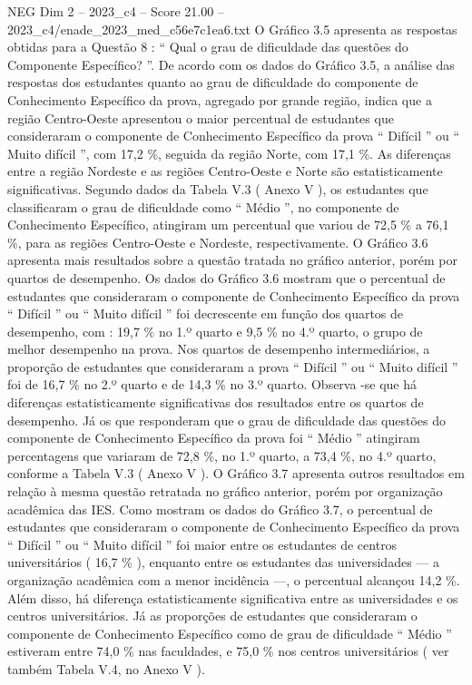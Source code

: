 \begin{textsample}{NEG Dim 2 – 2023\_c4 – Score 21.00 – 2023\_c4/enade\_2023\_med\_c56e7c1ea6.txt}
O Gráfico 3.5 apresenta as respostas obtidas para a Questão 8 : “ Qual o grau de dificuldade das questões do Componente Específico? ”.
De acordo com os dados do Gráfico 3.5, a análise das respostas dos estudantes quanto ao grau de dificuldade do componente de Conhecimento Específico da prova, agregado por grande região, indica que a região Centro-Oeste apresentou o maior percentual de estudantes que consideraram o componente de Conhecimento Específico da prova “ Difícil ” ou “ Muito difícil ”, com 17,2 \%, seguida da região Norte, com 17,1 \%.
As diferenças entre a região Nordeste e as regiões Centro-Oeste e Norte são estatisticamente significativas.
Segundo dados da Tabela V.3 ( Anexo V ), os estudantes que classificaram o grau de dificuldade como “ Médio ”, no componente de Conhecimento Específico, atingiram um percentual que variou de 72,5 \% a 76,1 \%, para as regiões Centro-Oeste e Nordeste, respectivamente.
O Gráfico 3.6 apresenta mais resultados sobre a questão tratada no gráfico anterior, porém por quartos de desempenho.
Os dados do Gráfico 3.6 mostram que o percentual de estudantes que consideraram o componente de Conhecimento Específico da prova “ Difícil ” ou “ Muito difícil ” foi decrescente em função dos quartos de desempenho, com : 19,7 \% no 1.º quarto e 9,5 \% no 4.º quarto, o grupo de melhor desempenho na prova.
Nos quartos de desempenho intermediários, a proporção de estudantes que consideraram a prova “ Difícil ” ou “ Muito difícil ” foi de 16,7 \% no 2.º quarto e de 14,3 \% no 3.º quarto.
Observa -se que há diferenças estatisticamente significativas dos resultados entre os quartos de desempenho.
Já os que responderam que o grau de dificuldade das questões do componente de Conhecimento Específico da prova foi “ Médio ” atingiram percentagens que variaram de 72,8 \%, no 1.º quarto, a 73,4 \%, no 4.º quarto, conforme a Tabela V.3 ( Anexo V ).
O Gráfico 3.7 apresenta outros resultados em relação à mesma questão retratada no gráfico anterior, porém por organização acadêmica das IES.
Como mostram os dados do Gráfico 3.7, o percentual de estudantes que consideraram o componente de Conhecimento Específico da prova “ Difícil ” ou “ Muito difícil ” foi maior entre os estudantes de centros universitários ( 16,7 \% ), enquanto entre os estudantes das universidades — a organização acadêmica com a menor incidência —, o percentual alcançou 14,2 \%.
Além disso, há diferença estatisticamente significativa entre as universidades e os centros universitários.
Já as proporções de estudantes que consideraram o componente de Conhecimento Específico como de grau de dificuldade “ Médio ” estiveram entre 74,0 \% nas faculdades, e 75,0 \% nos centros universitários ( ver também Tabela V.4, no Anexo V ).

\end{textsample}
